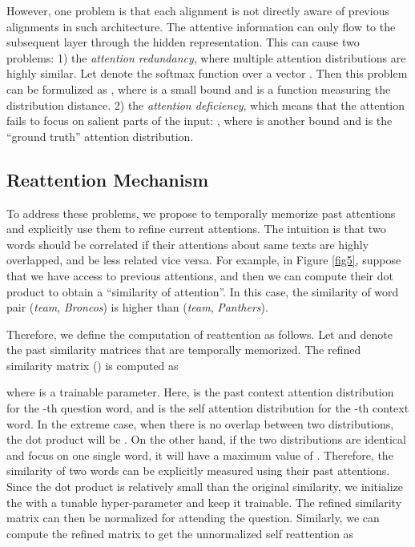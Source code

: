 \documentclass{article}
\begin{document}
However, one problem is that each alignment is not directly aware of previous alignments in such architecture. 
The attentive information can only flow to the subsequent layer through the hidden representation. 
This can cause two problems: 
1) the \emph{attention redundancy}, where multiple attention distributions are highly similar. Let  denote the softmax function over a vector . Then this problem can be formulized as , where  is a small bound and  is a function measuring the distribution distance. 
2) the \emph{attention deficiency}, which means that the attention fails to focus on salient parts of the input: , where  is another bound and  is the ``ground truth'' attention distribution.


\subsection{Reattention Mechanism}
To address these problems, we propose to temporally memorize past attentions and explicitly use them to refine current attentions. 
The intuition is that two words should be correlated if their attentions about same texts are highly overlapped, and be less related vice versa.
For example, in Figure \ref{fig5}, suppose that we have access to previous attentions, and then we can compute their dot product to obtain a ``similarity of attention''. In this case, the similarity of word pair (\emph{team}, \emph{Broncos}) is higher than (\emph{team}, \emph{Panthers}).

Therefore, we define the computation of reattention as follows.
Let  and  denote the past similarity matrices that are temporally memorized. The refined similarity matrix  () is computed as

where  is a trainable parameter. Here,  is the past context attention distribution for the -th question word, and  is the self attention distribution for the -th context word. 
In the extreme case, when there is no overlap between two distributions, the dot product will be . 
On the other hand, if the two distributions are identical and focus on one single word, it will have a maximum value of . 
Therefore, the similarity of two words can be explicitly measured using their past attentions.
Since the dot product is relatively small than the original similarity, we initialize the  with a tunable hyper-parameter and keep it trainable.
The refined similarity matrix can then be normalized for attending the question.
Similarly, we can compute the refined matrix  to get the unnormalized self reattention as
\end{document}
